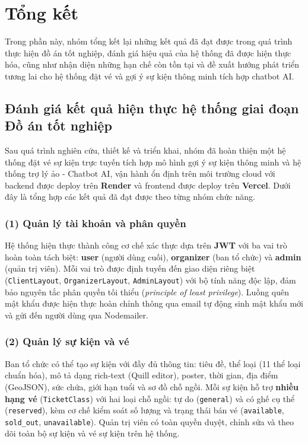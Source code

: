 \section{Tổng kết}

\indent \indent Trong phần này, nhóm tổng kết lại những kết quả đã đạt được trong quá trình
thực hiện đồ án tốt nghiệp, đánh giá hiệu quả của hệ thống đã được hiện thực
hóa, cũng như nhận diện những hạn chế còn tồn tại và đề xuất hướng phát triển
tương lai cho hệ thống đặt vé và gợi ý sự kiện thông minh tích hợp chatbot AI.

\subsection{Đánh giá kết quả hiện thực hệ thống giai đoạn Đồ án tốt nghiệp}

\indent \indent Sau quá trình nghiên cứu, thiết kế và triển khai, nhóm đã hoàn thiện một hệ
thống đặt vé sự kiện trực tuyến tích hợp mô hình gợi ý sự kiện thông minh và hệ thống trợ lý ảo - Chatbot AI, vận hành ổn định trên môi trường cloud với backend được
deploy trên \textbf{Render} và frontend được deploy trên \textbf{Vercel}.
Dưới đây là tổng hợp các kết quả đã đạt được theo từng nhóm chức năng.

\subsubsection*{(1) Quản lý tài khoản và phân quyền}

\indent \indent Hệ thống hiện thực thành công cơ chế xác thực dựa trên \textbf{JWT} với ba
vai trò hoàn toàn tách biệt: \textbf{user} (người dùng cuối), \textbf{organizer}
(ban tổ chức) và \textbf{admin} (quản trị viên). Mỗi vai trò được định tuyến
đến giao diện riêng biệt (\texttt{ClientLayout}, \texttt{OrganizerLayout},
\texttt{AdminLayout}) với bộ tính năng độc lập, đảm bảo nguyên tắc phân quyền
tối thiểu (\textit{principle of least privilege}). Luồng quên mật khẩu được
hiện thực hoàn chỉnh thông qua email tự động sinh mật khẩu mới và gửi đến
người dùng qua Nodemailer.

\subsubsection*{(2) Quản lý sự kiện và vé}

\indent \indent Ban tổ chức có thể tạo sự kiện với đầy đủ thông tin: tiêu đề, thể loại
(11 thể loại chuẩn hóa), mô tả dạng rich-text (Quill editor), poster, thời
gian, địa điểm (GeoJSON), sức chứa, giới hạn tuổi và sơ đồ chỗ ngồi. Mỗi
sự kiện hỗ trợ \textbf{nhiều hạng vé} (\texttt{TicketClass}) với hai loại
chỗ ngồi: tự do (\texttt{general}) và có ghế cụ thể (\texttt{reserved}),
kèm cơ chế kiểm soát số lượng và trạng thái bán vé (\texttt{available},
\texttt{sold\_out}, \texttt{unavailable}). Quản trị viên có toàn quyền duyệt,
chỉnh sửa và theo dõi toàn bộ sự kiện và vé sự kiện trên hệ thống.


